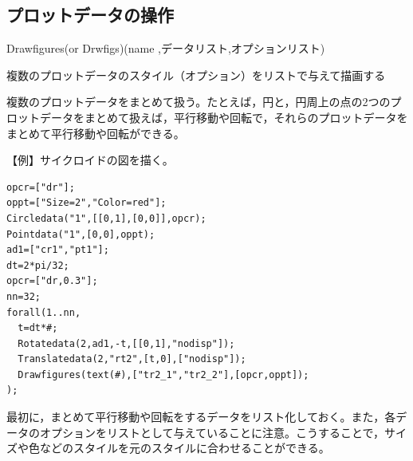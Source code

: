 \documentclass[papersize,a4paper,10pt,uplatex]{jsarticle}
\begin{document}
\subsection{プロットデータの操作}
\begin{description}

\hypertarget{drawfigures}{}
\item[関数]Drawfigures(or Drwfigs)(name ,データリスト,オプションリスト)
\item[機能]複数のプロットデータのスタイル（オプション）をリストで与えて描画する
\item[説明]複数のプロットデータをまとめて扱う。たとえば，円と，円周上の点の2つのプロットデータをまとめて扱えば，平行移動や回転で，それらのプロットデータをまとめて平行移動や回転ができる。%


\vspace{\baselineskip}
【例】サイクロイドの図を描く。
\begin{verbatim}
opcr=["dr"];
oppt=["Size=2","Color=red"];
Circledata("1",[[0,1],[0,0]],opcr);
Pointdata("1",[0,0],oppt);
ad1=["cr1","pt1"];
dt=2*pi/32;
opcr=["dr,0.3"];
nn=32;
forall(1..nn,
  t=dt*#;
  Rotatedata(2,ad1,-t,[[0,1],"nodisp"]);
  Translatedata(2,"rt2",[t,0],["nodisp"]);
  Drawfigures(text(#),["tr2_1","tr2_2"],[opcr,oppt]);
);
\end{verbatim}

\vspace{\baselineskip}
\hspace{20mm}  

最初に，まとめて平行移動や回転をするデータをリスト化しておく。また，各データのオプションをリストとして与えていることに注意。こうすることで，サイズや色などのスタイルを元のスタイルに合わせることができる。


\end{description}
\end{document}
